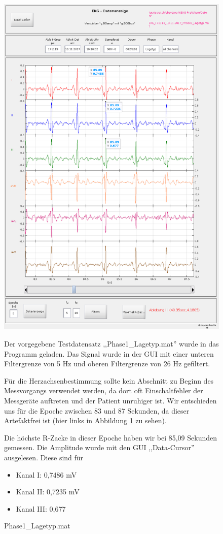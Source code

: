 \documentclass[a4paper,12pt,titlepage]{scrartcl}
\begin{document}
\begin{figure}[ht]
    \begin{minipage}[t]{0.5\linewidth}
        \centering
        \includegraphics[width=0.9\linewidth, valign=t]{Assets/LaborBMT-15-11-03.png}
        \caption{Phase1\_Lagetyp.mat}
        \label{lagetyp}
    \end{minipage}%
    \begin{minipage}[t]{0.5\linewidth}
        Der vorgegebene Testdatensatz ,,Phase1\_Lagetyp.mat'' wurde in das Programm geladen. Das Signal wurde in der GUI mit einer unteren Filtergrenze von 5 Hz und oberen Filtergrenze von 26 Hz gefiltert.

        Für die Herzachsenbestimmung sollte kein Abschnitt zu Beginn des Messvorgangs verwendet werden, da dort oft Einschaltfehler der Messgeräte auftreten und der Patient unruhiger ist. Wir entschieden uns für die Epoche zwischen 83 und 87 Sekunden, da dieser Artefaktfrei ist (hier links in Abbildung \ref{lagetyp} zu sehen).

        Die höchste R-Zacke in dieser Epoche haben wir bei 85,09 Sekunden gemessen.
        Die Amplitude wurde mit den GUI ,,Data-Cursor'' ausgelesen. Diese sind für
        \begin{itemize}
            \item Kanal I: 0,7486 mV
            \item Kanal II: 0,7235 mV
            \item Kanal III: 0,677
        \end{itemize}
    \end{minipage}
\end{figure}
\end{document}
